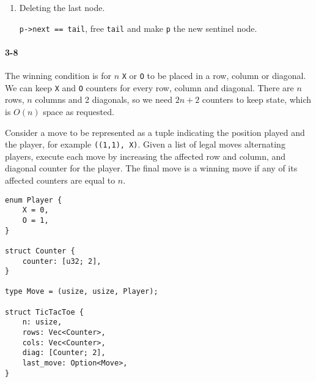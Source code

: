 \documentclass{report}
\begin{document}
\begin{enumerate}[label=\arabic*)]
    \item Deleting the last node.
    
    \begin{center}
    \end{center}
    
    \lstinline!p->next == tail!, free \lstinline!tail! and make \lstinline!p! the new sentinel node.
    
	\begin{center}    
    \end{center}
\end{enumerate}

\paragraph{3-8} The winning condition is for $n$ \lstinline!X! or \lstinline!O! to be placed in a row, column or diagonal. We can keep \lstinline!X! and \lstinline!O! counters for every row, column and diagonal. There are $n$ rows, $n$ columns and 2 diagonals, so we need $2n+2$ counters to keep state, which is $O(n)$ space as requested.

Consider a move to be represented as a tuple indicating the position played and the player, for example \lstinline!((1,1), X)!. Given a list of legal moves alternating players, execute each move by increasing the affected row and column, and diagonal counter for the player. The final move is a winning move if any of its affected counters are equal to $n$.

\begin{lstlisting}
enum Player {
    X = 0,
    O = 1,
}

struct Counter {
    counter: [u32; 2],
}

type Move = (usize, usize, Player);

struct TicTacToe {
    n: usize,
    rows: Vec<Counter>,
    cols: Vec<Counter>,
    diag: [Counter; 2],
    last_move: Option<Move>,
}
\end{lstlisting}
\end{document}
